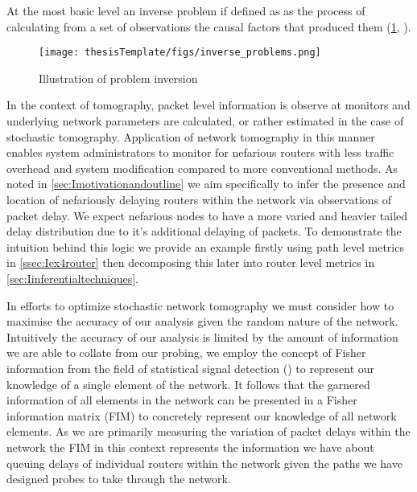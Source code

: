 At the most basic level an inverse problem if defined as as the process of calculating from a set of observations the causal factors that produced them (\cref{fig:probleminv}, \cite{sadri_effect_2019}).
\begin{figure}[H]
    \centering
    \texttt{[image: thesisTemplate/figs/inverse\_problems.png]}
    \caption[Illustration of problem inversion]{Illustration of problem inversion \cite{sadri_effect_2019}}
    \label{fig:probleminv}
\end{figure}
In the context of tomography, packet level information is observe at monitors and underlying network parameters are calculated, or rather estimated in the case of stochastic tomography. Application of network tomography in this manner enables system administrators to monitor for nefarious routers with less traffic overhead and system modification compared to more conventional methods. As noted in \cref{sec:Imotivationandoutline} we aim specifically to infer the presence and location of nefariously delaying routers within the network via observations of packet delay. We expect nefarious nodes to have a more varied and heavier tailed delay distribution due to it's additional delaying of packets. To demonstrate the intuition behind this logic we provide an example firstly using path level metrics in \cref{ssec:Iex4router} then decomposing this later into router level metrics in \cref{sec:Iinferentialtechniques}.\par
In efforts to optimize stochastic network tomography we must consider how to maximise the accuracy of our analysis given the random nature of the network. Intuitively the accuracy of our analysis is limited by the amount of information we are able to collate from our probing, we employ the concept of Fisher information from the field of statistical signal detection (\cite{poor_introduction_1994}) to represent our knowledge of a single element of the network. It follows that the garnered information of all elements in the network can be presented in a Fisher information matrix (FIM) to concretely represent our knowledge of all network elements. As we are primarily measuring the variation of packet delays within the network the FIM in this context represents the information we have about queuing delays of individual routers within the network given the paths we have designed probes to take through the network.\par

